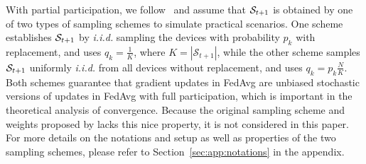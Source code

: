 With partial participation, we follow~\cite{li2018federated,karimireddy2019scaffold,li2019convergence} and assume that ${\mathcal{S}}_{t+1}$ is obtained by one of two types of
sampling schemes to simulate practical scenarios. One scheme establishes ${\mathcal{S}}_{t+1}$ by \emph{i.i.d.} sampling the devices with probability $p_k$ with replacement, and uses $q_k=\frac{1}{K}$, where $K=|\mathcal{S}_{t+1}|$, while the other scheme samples ${\mathcal{S}}_{t+1}$ uniformly \emph{i.i.d.} from all devices without replacement, and uses $q_k=p_k\frac{N}{K}$.
Both schemes
guarantee that gradient updates in FedAvg are unbiased stochastic versions of
updates in FedAvg with full participation, which is important in the theoretical analysis of convergence. Because the original sampling scheme and weights proposed by \cite{mcmahan2016communication} lacks this nice property, it is not considered in this paper. For 
more details on the notations and setup as well as properties of the two sampling schemes, please refer to Section~\ref{sec:app:notations} in the appendix.
